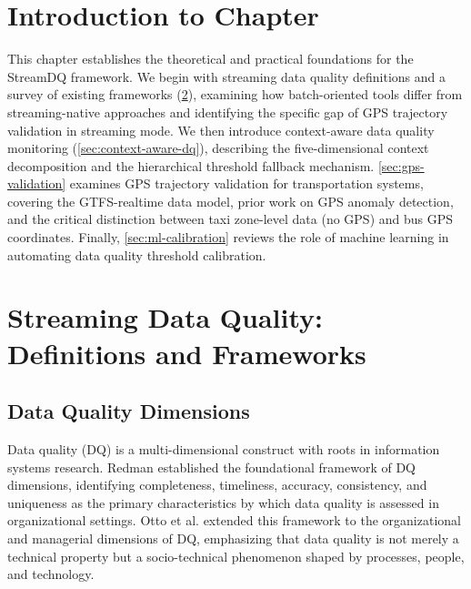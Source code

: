 
\section{Introduction to Chapter}
\label{sec:ch1-intro}

This chapter establishes the theoretical and practical foundations for the
StreamDQ framework. We begin with streaming data quality definitions and a
survey of existing frameworks (\ref{sec:streaming-dq}), examining how
batch-oriented tools differ from streaming-native approaches and identifying
the specific gap of GPS trajectory validation in streaming mode. We then
introduce context-aware data quality monitoring (\ref{sec:context-aware-dq}),
describing the five-dimensional context decomposition and the hierarchical
threshold fallback mechanism. \ref{sec:gps-validation} examines GPS trajectory
validation for transportation systems, covering the GTFS-realtime data model,
prior work on GPS anomaly detection, and the critical distinction between
taxi zone-level data (no GPS) and bus GPS coordinates. Finally,
\ref{sec:ml-calibration} reviews the role of machine learning in
automating data quality threshold calibration.

\section{Streaming Data Quality: Definitions and Frameworks}
\label{sec:streaming-dq}

\subsection{Data Quality Dimensions}
\label{sec:dq-dimensions}

Data quality (DQ) is a multi-dimensional construct with roots in information
systems research. Redman \citep{redman1998} established the foundational
framework of DQ dimensions, identifying completeness, timeliness, accuracy,
consistency, and uniqueness as the primary characteristics by which data
quality is assessed in organizational settings. Otto et al. \citep{otto2011}
extended this framework to the organizational and managerial dimensions of
DQ, emphasizing that data quality is not merely a technical property but
a socio-technical phenomenon shaped by processes, people, and technology.

